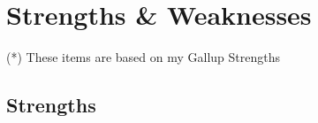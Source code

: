 \documentclass[10pt, a4paper, twocolumn]{article}
\begin{document}
%
%
%
%
%





\clearpage

\section*{Strengths \& Weaknesses}

(*) These items are based on my Gallup Strengths
\subsection*{Strengths}
\end{document}
